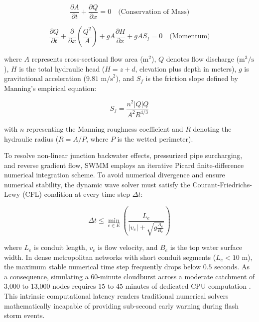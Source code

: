 \documentclass[conference]{IEEEtran}
\begin{document}
\begin{equation}
\frac{\partial A}{\partial t} + \frac{\partial Q}{\partial x} = 0 \quad \text{(Conservation of Mass)}
\end{equation}

\begin{equation}
\frac{\partial Q}{\partial t} + \frac{\partial}{\partial x}\left(\frac{Q^2}{A}\right) + g A \frac{\partial H}{\partial x} + g A S_f = 0 \quad \text{(Momentum)}
\end{equation}

where $A$ represents cross-sectional flow area ($\text{m}^2$), $Q$ denotes flow discharge ($\text{m}^3\text{/s}$), $H$ is the total hydraulic head ($H = z + d$, elevation plus depth in meters), $g$ is gravitational acceleration ($9.81\text{ m/s}^2$), and $S_f$ is the friction slope defined by Manning's empirical equation:

\begin{equation}
S_f = \frac{n^2 |Q| Q}{A^2 R^{4/3}}
\end{equation}

with $n$ representing the Manning roughness coefficient and $R$ denoting the hydraulic radius ($R = A/P$, where $P$ is the wetted perimeter).

To resolve non-linear junction backwater effects, pressurized pipe surcharging, and reverse gradient flow, SWMM employs an iterative Picard finite-difference numerical integration scheme. To avoid numerical divergence and ensure numerical stability, the dynamic wave solver must satisfy the Courant-Friedrichs-Lewy (CFL) condition at every time step $\Delta t$:

\begin{equation}
\Delta t \le \min_{e \in E} \left( \frac{L_e}{|v_e| + \sqrt{g \frac{A_e}{B_e}}} \right)
\end{equation}

where $L_e$ is conduit length, $v_e$ is flow velocity, and $B_e$ is the top water surface width. In dense metropolitan networks with short conduit segments ($L_e < 10\text{ m}$), the maximum stable numerical time step frequently drops below $0.5\text{ seconds}$. As a consequence, simulating a 60-minute cloudburst across a moderate catchment of 3,000 to 13,000 nodes requires 15 to 45 minutes of dedicated CPU computation \cite{bates2000}. This intrinsic computational latency renders traditional numerical solvers mathematically incapable of providing sub-second early warning during flash storm events.
\end{document}
